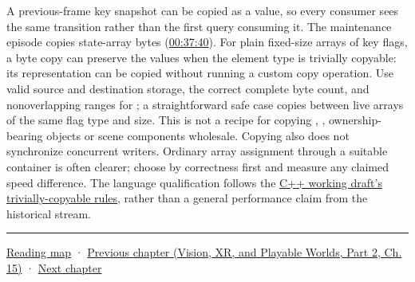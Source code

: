 A previous-frame key snapshot can be copied as a value, so every consumer sees the same transition rather than the first query consuming it. The maintenance episode copies state-array bytes (\href{https://www.youtube.com/watch?v=CKhGMoTNPOo&t=2260}{00:37:40}). For plain fixed-size arrays of key flags, a byte copy can preserve the values when the element type is trivially copyable: its representation can be copied without running a custom copy operation. Use valid source and destination storage, the correct complete byte count, and nonoverlapping ranges for ; a straightforward safe case copies between live arrays of the same flag type and size. This is not a recipe for copying , , ownership-bearing objects or scene components wholesale. Copying also does not synchronize concurrent writers. Ordinary array assignment through a suitable container is often clearer; choose by correctness first and measure any claimed speed difference. The language qualification follows the \href{https://eel.is/c++draft/basic.types\#basic.types.trivial}{C++ working draft's trivially-copyable rules}, rather than a general performance claim from the historical stream.

\begin{center}\rule{0.5\linewidth}{0.5pt}\end{center}

\hyperref[volume-reading-map]{Reading map} · \href{../07-Vision-XR-and-Playable-Worlds-P02/main.pdf\#nameddest=05-engine-i-ch012-transactions-recovery-and-safe-project-boundaries}{Previous chapter (Vision, XR, and Playable Worlds, Part 2, Ch. 15)} · \hyperref[05-engine-i-ch014-application-clocks-and-stable-input-identity]{Next chapter}
